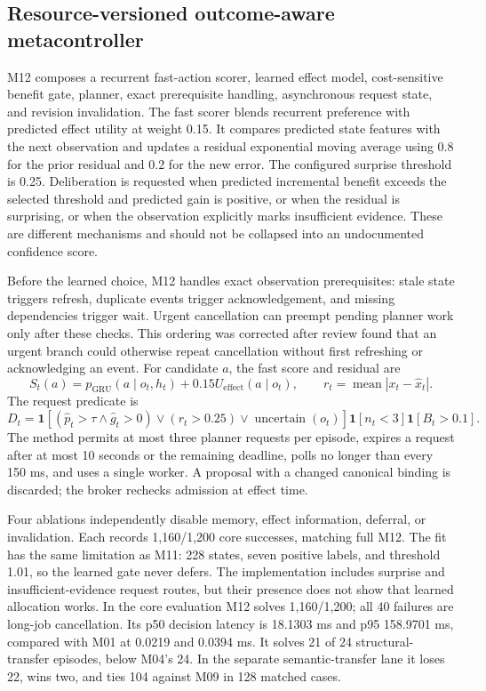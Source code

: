 \subsection{Resource-versioned outcome-aware metacontroller}\label{sec:method-m12}
M12 composes a recurrent fast-action scorer, learned effect model, cost-sensitive benefit gate, planner, exact prerequisite handling, asynchronous request state, and revision invalidation. The fast scorer blends recurrent preference with predicted effect utility at weight 0.15. It compares predicted state features with the next observation and updates a residual exponential moving average using 0.8 for the prior residual and 0.2 for the new error. The configured surprise threshold is 0.25. Deliberation is requested when predicted incremental benefit exceeds the selected threshold and predicted gain is positive, or when the residual is surprising, or when the observation explicitly marks insufficient evidence. These are different mechanisms and should not be collapsed into an undocumented confidence score.

Before the learned choice, M12 handles exact observation prerequisites: stale state triggers refresh, duplicate events trigger acknowledgement, and missing dependencies trigger wait. Urgent cancellation can preempt pending planner work only after these checks. This ordering was corrected after review found that an urgent branch could otherwise repeat cancellation without first refreshing or acknowledging an event. For candidate $a$, the fast score and residual are
\begin{equation}
S_t(a)=p_{\mathrm{GRU}}(a\mid o_t,h_t)+0.15U_{\mathrm{effect}}(a\mid o_t),\qquad
r_t=\operatorname{mean}|x_t-\widehat x_t|.
\end{equation}
The request predicate is
\begin{equation}
D_t=\mathbf{1}[(\hat p_t>\tau\land\hat g_t>0)\lor(r_t>0.25)\lor\operatorname{uncertain}(o_t)]
\mathbf{1}[n_t<3]\mathbf{1}[B_t>0.1].
\end{equation}
The method permits at most three planner requests per episode, expires a request after at most 10 seconds or the remaining deadline, polls no longer than every 150 ms, and uses a single worker. A proposal with a changed canonical binding is discarded; the broker rechecks admission at effect time.

Four ablations independently disable memory, effect information, deferral, or invalidation. Each records 1,160/1,200 core successes, matching full M12. The fit has the same limitation as M11: 228 states, seven positive labels, and threshold 1.01, so the learned gate never defers. The implementation includes surprise and insufficient-evidence request routes, but their presence does not show that learned allocation works. In the core evaluation M12 solves 1,160/1,200; all 40 failures are long-job cancellation. Its p50 decision latency is 18.1303 ms and p95 158.9701 ms, compared with M01 at 0.0219 and 0.0394 ms. It solves 21 of 24 structural-transfer episodes, below M04's 24. In the separate semantic-transfer lane it loses 22, wins two, and ties 104 against M09 in 128 matched cases.

